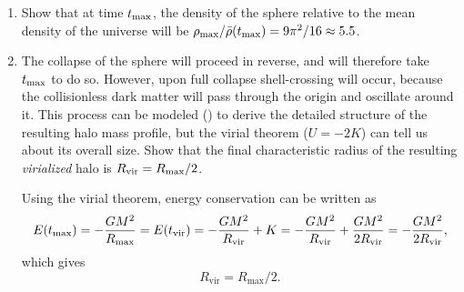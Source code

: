 \begin{enumerate}
\begin{enumerate}
\item Show that at time $t_{\rm max}$, the density of the sphere
relative to the mean density of the universe will be $\rho_{\rm max}
/ \bar\rho(t_{\rm max}) = 9 \pi^2 / 16 \approx 5.5$.

\item The collapse of the sphere will proceed in reverse, and will
therefore take $t_{\rm max}$ to do so. However, upon full collapse
shell-crossing will occur, because the collisionless dark matter will
pass through the origin and oscillate around it. This process can be
modeled (\citealt{bertschinger85a, lithwick11a}) to derive the detailed
structure of the resulting halo mass profile, but the virial theorem
($U=-2K$) can tell us about its overall size. Show that the final
characteristic radius of the resulting {\it virialized} halo is
$R_{\rm vir} = R_{\rm max} / 2$.

\begin{answer}
Using the virial theorem, energy conservation
can be written as
\begin{equation}
E(t_{\rm max}) = -\frac{GM^2}{R_\text{max}} = E(t_{\rm vir}) =
-\frac{GM^2}{R_\text{vir}} + K = -\frac{GM^2}{R_\text{vir}} +
\frac{GM^2}{2R_\text{vir}} = -\frac{GM^2}{2R_\text{vir}},
\end{equation}
which gives
\begin{equation}
R_\text{vir}=R_\text{max}/2.
\end{equation}
\end{answer}


\end{enumerate}
\end{enumerate}
